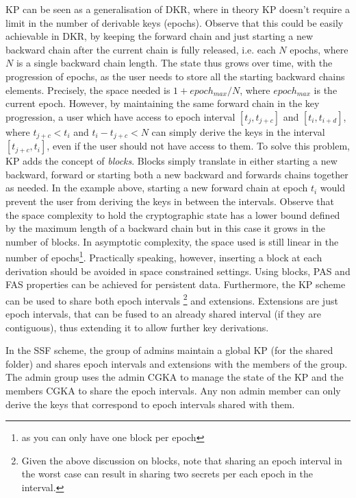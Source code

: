 KP can be seen as a generalisation of DKR, where in theory KP doesn't require
a limit in the number of derivable keys (epochs).
Observe that this could be easily achievable in DKR, by keeping the forward chain
and just starting a new backward chain after the current chain is fully released,
i.e. each $N$ epochs, where $N$ is a single backward chain length.
The state thus grows over time, with the progression of epochs, as the user needs to store
all the starting backward chains elements. Precisely, the space needed
is $1 + epoch_{max} / N$, where $epoch_{max}$ is the current epoch.
However, by maintaining the same forward chain in the key progression,
a user which have access to epoch interval 
$[t_j, t_{j + c}]$ and $[t_i, t_{i + d}]$, 
where $t_{j + c} < t_i$ and $t_i - t_{j + c} < N$  
can simply derive the keys in the interval $[t_{j + c}, t_i]$, even if 
the user should not have access to them.
To solve this problem, KP adds the concept of \textit{blocks}.
Blocks simply translate in either starting a new backward, forward or 
starting both a new backward and forwards chains together as needed. 
In the example above, starting a new forward chain
at epoch $t_i$ would prevent the user from deriving the keys in between 
the intervals. Observe that the space complexity to hold the cryptographic
state has a lower bound defined by the maximum length of a backward chain
but in this case it grows in the number of blocks. In asymptotic
complexity, the space used is still linear in the number of epochs\footnote{as you can only have one block per epoch}.
Practically speaking, however, inserting a block at each derivation
should be avoided in space constrained settings. 
Using blocks, PAS and FAS properties can be achieved for persistent data.
Furthermore, the KP scheme can be used to share both epoch intervals
\footnote{Given the above discussion on blocks, note that sharing an epoch interval in the worst case can result in sharing two secrets per each epoch in the interval.}
and extensions. Extensions are just epoch intervals, that can be fused 
to an already shared interval (if they are contiguous), thus extending it to
allow further key derivations.

In the SSF scheme, the group of admins maintain a global KP (for the shared folder)
and shares epoch intervals and extensions with the members of the group.
The admin group uses the admin CGKA to manage the state of the KP and the members
CGKA to share the epoch intervals. 
Any non admin member can only derive the keys
that correspond to epoch intervals shared with them.

